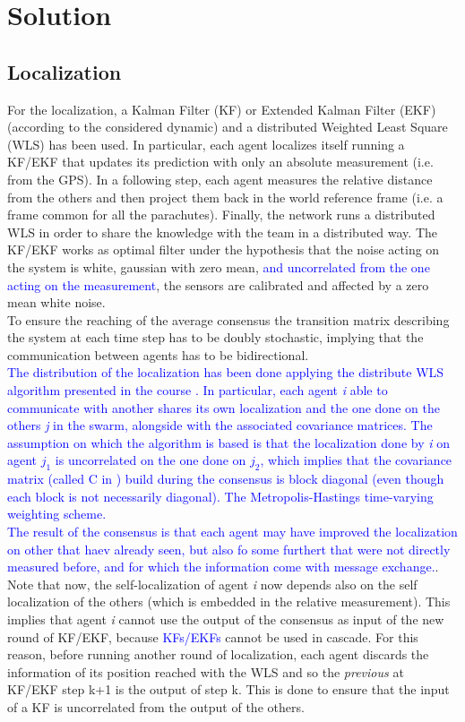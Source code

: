 \section{Solution}\label{sec:solution}
\subsection{Localization}\label{subsec:solution_localization}
For the localization, a Kalman Filter (KF) or Extended Kalman Filter (EKF) \cite{b12} (according to the considered dynamic) and a distributed Weighted Least Square (WLS) has been used. In particular, each agent localizes itself running a KF/EKF that updates its prediction with only an absolute measurement (i.e. from the GPS). In a following step, each agent measures the relative distance from the others and then project them back in the world reference frame (i.e. a frame common for all the parachutes). Finally, the network runs a distributed WLS in order to share the knowledge with the team in a distributed way. The KF/EKF works as optimal filter under the hypothesis that the noise acting on the system is white, gaussian with zero mean, \textcolor{blue}{and uncorrelated from the one acting on the measurement}, the sensors are calibrated and affected by a zero mean white noise.\\
 To ensure the reaching of the average consensus the transition matrix describing the system at each time step has to be doubly stochastic, implying that the communication between agents has to be bidirectional.\\
 \textcolor{blue}{The distribution of the localization has been done applying the distribute WLS algorithm presented in the course \cite{b13}. In particular, each agent \textit{i} able to communicate with another shares its own localization and the one done on the others \textit{j} in the swarm, alongside with the associated covariance matrices. The assumption on which the algorithm is based is that the localization done by \textit{i} on agent \textit{$j_1$} is uncorrelated on the one done on \textit{$j_2$}, which implies that the covariance matrix (called C in \cite{b13}) build during the consensus is block diagonal (even though each block is not necessarily diagonal). The Metropolis-Hastings time-varying weighting scheme.\\
The result of the consensus is that each agent may have improved the localization on other that haev already seen, but also fo some furthert that were not directly measured before, and for which the information come with message exchange.}. Note that now, the self-localization of agent \textit{i} now depends also on the self localization of the others (which is embedded in the relative measurement). This implies that agent \textit{i} cannot use the output of the consensus as input of the new round of KF/EKF, because \textcolor{blue}{KFs/EKFs} cannot be used in cascade. For this reason, before running another round of localization, each agent discards the information of its position reached with the WLS and so the \textit{previous} at KF/EKF step k+1 is the output of step k. This is done to ensure that the input of a KF is uncorrelated from the output of the others.\\
